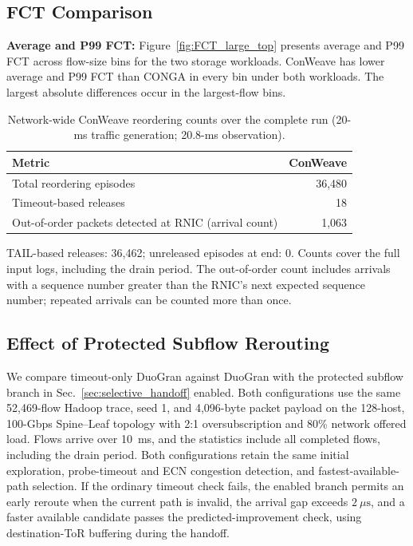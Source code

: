 \documentclass[10pt,journal,compsoc]{IEEEtran}
\begin{document}
\subsection{FCT Comparison}
\label{sec:result}




\noindent
\textbf{Average and P99 FCT:} Figure~\ref{fig:FCT_large_top} presents average and P99 FCT across flow-size bins for the two storage workloads. ConWeave has lower average and P99 FCT than CONGA in every bin under both workloads. The largest absolute differences occur in the largest-flow bins.







\begin{table}[t]
    \centering
    \caption{Network-wide ConWeave reordering counts over the complete run (20-ms traffic generation; 20.8-ms observation).}
    \label{tab:conweave_reordering_observation}
    \footnotesize
    \renewcommand{\arraystretch}{1.15}
    \begin{tabularx}{\columnwidth}{@{}Xr@{}}
        \toprule
        \textbf{Metric} & \textbf{ConWeave} \\
        \midrule
        Total reordering episodes & 36,480 \\
        Timeout-based releases & 18 \\
        Out-of-order packets detected at RNIC (arrival count) & 1,063 \\
        \bottomrule
    \end{tabularx}
    \par\smallskip
    \begin{minipage}{\columnwidth}
    \footnotesize TAIL-based releases: 36,462; unreleased episodes at end: 0. Counts cover the full input logs, including the drain period. The out-of-order count includes arrivals with a sequence number greater than the RNIC's next expected sequence number; repeated arrivals can be counted more than once.
    \end{minipage}
\end{table}

\subsection{Effect of Protected Subflow Rerouting}
\label{sec:subflow_fct_ablation}

We compare timeout-only DuoGran against DuoGran with the protected subflow branch in Sec.~\ref{sec:selective_handoff} enabled. Both configurations use the same 52,469-flow Hadoop trace, seed 1, and 4,096-byte packet payload on the 128-host, 100-Gbps Spine--Leaf topology with 2:1 oversubscription and 80\% network offered load. Flows arrive over 10~ms, and the statistics include all completed flows, including the drain period. Both configurations retain the same initial exploration, probe-timeout and ECN congestion detection, and fastest-available-path selection. If the ordinary timeout check fails, the enabled branch permits an early reroute when the current path is invalid, the arrival gap exceeds $2~\mu\mathrm{s}$, and a faster available candidate passes the predicted-improvement check, using destination-ToR buffering during the handoff.
\end{document}
